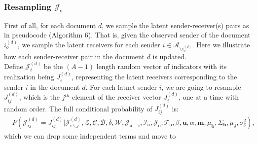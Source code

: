 \documentclass[a4paper]{article}
\begin{document}
   \subsubsection{Resampling $\mathcal{J}_{\mbox{a}}$} \label{subsec: Data augmentation}
   First of all, for each document $d$, we sample the latent sender-receiver(s) pairs as in pseudocode (Algorithm 6). That is, given the observed sender of the document $i_o^{(d)}$, we sample the latent receivers for each sender $i \in \mathcal{A}_{\backslash i_o^{(d)}}$. Here we illustrate how each sender-receiver pair in the document $d$ is updated.\\\newline
   Define ${\mathcal{J}}^{(d)}_{i}$ be the $(A-1)$ length random vector of indicators with its realization being $J^{(d)}_{i}$, representing the latent receivers corresponding to the sender $i$ in the document $d$. For each latnet sender $i$, we are going to resample ${J}^{(d)}_{ij}$, which is the $j^{th}$ element of the receiver vector ${J}^{(d)}_{i}$, one at a time with random order. The full conditional probability of ${J}^{(d)}_{ij}$ is:
   \begin{equation}
   \begin{aligned}
   & P(\mathcal{J}^{(d)}_{ij} = {J}^{(d)}_{ij}|\mathcal{J}^{(d)}_{i\backslash j}, \mathcal{Z}, \mathcal{C},   \mathcal{B}, \delta, \mathcal{W},  \mathcal{J}_{\mbox{a}, -i}, \mathcal{I}_{\mbox{o}}, \mathcal{J}_{\mbox{o}}, \mathcal{T}_{\mbox{o}}, \beta, \boldsymbol{u}, \alpha, \boldsymbol{m},  \mu_{\boldsymbol{b}}, \Sigma_{\boldsymbol{b}}, \mu_\delta, \sigma^2_\delta),
   \end{aligned}
   \end{equation}
   which we can drop some independent terms and move to 
\end{document}
